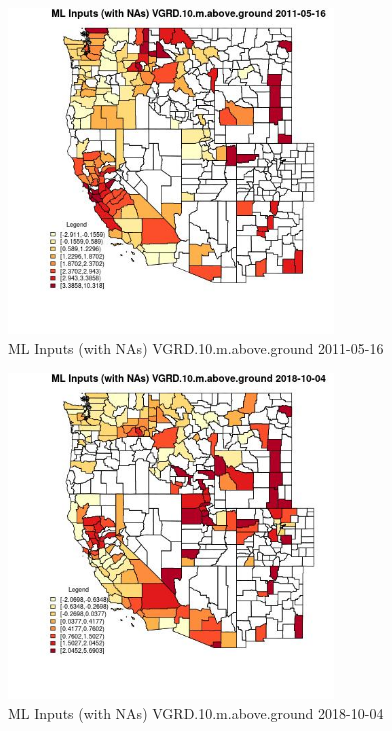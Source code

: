 \begin{figure} 
\centering  
\includegraphics[width=0.77\textwidth]{Code_Outputs/Report_ML_input_PM25_Step4_part_f_de_duplicated_aveswNAs_CountyVGRD10mabovegroundMean2011-05-16.jpg} 
\caption{\label{fig:Report_ML_input_PM25_Step4_part_f_de_duplicated_aveswNAsCountyVGRD10mabovegroundMean2011-05-16}ML Inputs (with NAs) VGRD.10.m.above.ground 2011-05-16} 
\end{figure} 
 

\begin{figure} 
\centering  
\includegraphics[width=0.77\textwidth]{Code_Outputs/Report_ML_input_PM25_Step4_part_f_de_duplicated_aveswNAs_CountyVGRD10mabovegroundMean2018-10-04.jpg} 
\caption{\label{fig:Report_ML_input_PM25_Step4_part_f_de_duplicated_aveswNAsCountyVGRD10mabovegroundMean2018-10-04}ML Inputs (with NAs) VGRD.10.m.above.ground 2018-10-04} 
\end{figure} 
 

